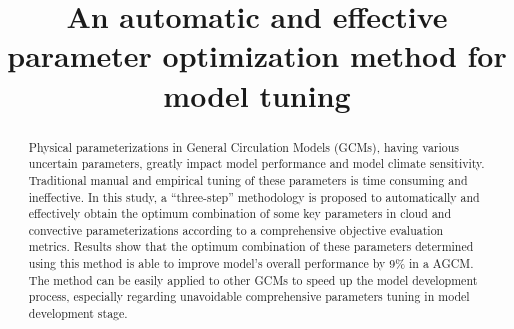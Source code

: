 \documentclass[gmd, manuscript]{copernicus}
\begin{document}
\linenumbers

\title{An automatic and effective parameter optimization method for model tuning}
















\maketitle
 

\begin{abstract}  

Physical parameterizations in General Circulation Models (GCMs), having various uncertain parameters, greatly impact model performance and model climate sensitivity.  Traditional manual and empirical tuning of these parameters is time consuming and ineffective. In this study, a ``three-step'' methodology is proposed to automatically and effectively obtain the optimum combination of some key parameters in cloud and convective parameterizations according to a comprehensive objective evaluation metrics. Results show that the optimum combination of these parameters determined using this method is able to improve model’s overall performance by 9\% in a AGCM. The method can be easily applied to other GCMs to speed up the model development process, especially regarding unavoidable comprehensive parameters tuning in model development stage.

\end{abstract}
\end{document}
